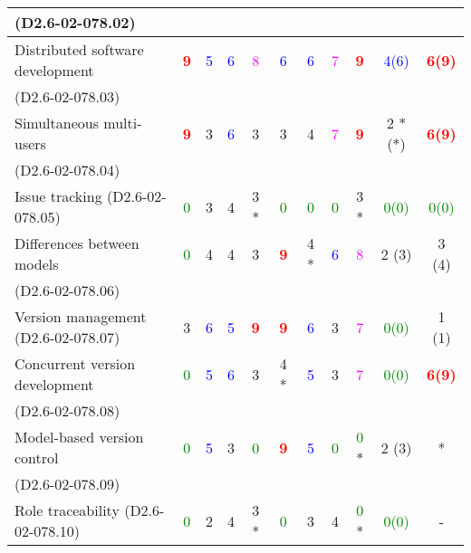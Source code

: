 \begin{tabular}{|l | c | c | c | c | c | c | c | c | c | c |}
(D2.6-02-078.02)  &  &      &  &  & & &  &    &   &   \\
\hline
Distributed software development    & \textcolor{red}{\textbf{9}} & \textcolor{blue}{5} & \textcolor{blue}{6} & \textcolor{magenta}{8} & \textcolor{blue}{6} & \textcolor{blue}{6} & \textcolor{magenta}{7} & \textcolor{red}{\textbf{9}} & \textcolor{blue}{4(6)}  & \textcolor{red}{\textbf{6(9)}}  \\
(D2.6-02-078.03)   &  &      &  &  & & &  &    &   &   \\
\hline
Simultaneous multi-users    & \textcolor{red}{\textbf{9}} & 3     & \textcolor{blue}{6} & 3     & 3     & 4     & \textcolor{magenta}{7} & \textcolor{red}{\textbf{9}} & 2 *(*) & \textcolor{red}{\textbf{6(9)}}  \\
(D2.6-02-078.04)  &  &      &  &  & & &  &    &   &   \\
\hline
Issue tracking (D2.6-02-078.05)  & \textcolor{green}{0} & 3     & 4     & 3    * & \textcolor{green}{0} & \textcolor{green}{0} & \textcolor{green}{0} & 3    * & \textcolor{green}{0(0)}  & \textcolor{green}{0(0)}  \\
\hline
Differences between models  & \textcolor{green}{0} & 4     & 4     & 3     & \textcolor{red}{\textbf{9}} & 4    * & \textcolor{blue}{6} & \textcolor{magenta}{8} & 2 (3) & 3 (4) \\
(D2.6-02-078.06)    &  &      &  &  & & &  &    &   &   \\
\hline
Version management (D2.6-02-078.07)  & 3     & \textcolor{blue}{6} & \textcolor{blue}{5} & \textcolor{red}{\textbf{9}} & \textcolor{red}{\textbf{9}} & \textcolor{blue}{6} & 3     & \textcolor{magenta}{7} & \textcolor{green}{0(0)}  & 1 (1) \\
\hline
Concurrent version development   & \textcolor{green}{0} & \textcolor{blue}{5} & \textcolor{blue}{6} & 3     & 4    * & \textcolor{blue}{5} & 3     & \textcolor{magenta}{7} & \textcolor{green}{0(0)}  & \textcolor{red}{\textbf{6(9)}}  \\
(D2.6-02-078.08)  &  &      &  &  & & &  &    &   &   \\
\hline
Model-based version control   & \textcolor{green}{0} & \textcolor{blue}{5} & 3     & \textcolor{green}{0} & \textcolor{red}{\textbf{9}} & \textcolor{blue}{5} & \textcolor{green}{0} & \textcolor{green}{0} * & 2 (3) & * \\
(D2.6-02-078.09)  &  &      &  &  & & &  &    &   &   \\
\hline
Role traceability (D2.6-02-078.10)  & \textcolor{green}{0} & 2     & 4     & 3    * & \textcolor{green}{0} & 3     & 4     & \textcolor{green}{0} * & \textcolor{green}{0(0)}  & - \\

\end{tabular}
